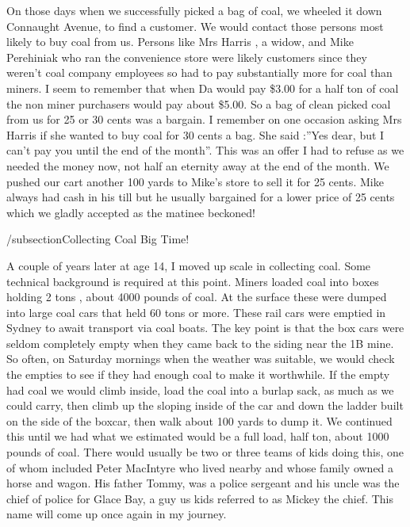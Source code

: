 On those days when we successfully picked a bag of coal, we wheeled it down Connaught Avenue, to find a customer. We would contact those persons most likely to buy coal from us. Persons like Mrs Harris , a widow, and Mike Perehiniak who ran the convenience store were likely customers since they weren't coal company employees so had to pay substantially more for coal than miners. I seem to remember that when Da would pay \$3.00 for a half ton of coal the non miner purchasers would pay about \$5.00. So a bag of clean picked coal from us for 25 or 30 cents was a bargain. I remember on one occasion asking Mrs Harris if she wanted to buy coal for 30 cents a bag. She said :”Yes dear, but I can't pay you until the end of the month”. This was an offer I had to refuse as we needed the money now, not half an eternity away at the end of the month. We pushed our cart another 100 yards to Mike's store to sell it for 25 cents. Mike always had cash in his till but he usually bargained for a lower price of 25 cents which we gladly accepted as the matinee beckoned!

/subsection{Collecting Coal Big Time!}

A couple of years later at age 14, I moved up scale in collecting coal. Some technical background is required at this point. Miners loaded coal into boxes holding 2 tons , about 4000 pounds of coal. At the surface these were dumped into large coal cars that held 60 tons or more. These rail cars were emptied in Sydney to await transport via coal boats. The key point is that the box cars were seldom completely empty when they came back to the siding near the 1B mine. So often, on Saturday mornings when the weather was suitable, we would check the empties to see if they had enough coal to make it worthwhile. If the empty had coal we would climb inside, load the coal into a burlap sack, as much as we could carry, then climb up the sloping inside of the car and down the ladder built on the side of the boxcar, then walk about 100 yards to dump it. We continued this until we had what we estimated would be a full load, half ton, about 1000 pounds of coal. There would usually be two or three teams of kids doing this, one of whom included Peter MacIntyre who lived nearby and whose family owned a horse and wagon. His father Tommy, was a police sergeant and his uncle was the chief of police for Glace Bay, a guy us kids referred to as Mickey the chief. This name will come up once again in my journey.

